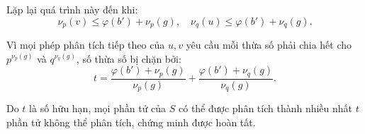 \documentclass[../06-largest-exponent.tex]{subfiles}
\begin{document}
\begin{soln}
	Lặp lại quá trình này đến khi:
	\[
		\nu_p(v) \leq \varphi(b') + \nu_p(g), \quad \nu_q(u) \leq \varphi(b') + \nu_q(g).
	\]
	
	Vì mọi phép phân tích tiếp theo của \( u, v \) yêu cầu mỗi thừa số phải chia hết cho \( p^{\nu_p(g)} \) và \( q^{\nu_q(g)} \), số thừa số bị chặn bởi:
	\[
		t = \frac{\varphi(b') + \nu_p(g)}{\nu_p(g)} + \frac{\varphi(b') + \nu_q(g)}{\nu_q(g)}.
	\]
	
	Do \( t \) là số hữu hạn, mọi phần tử của \( S \) có thể được phân tích thành nhiều nhất \( t \) phần tử không thể phân tích, chứng minh được hoàn tất.
\end{soln}

\end{document}
